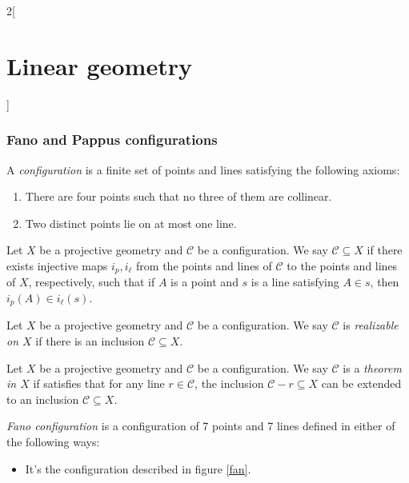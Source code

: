 \documentclass[../../../main.tex]{subfiles}
\begin{document}
\begin{multicols}{2}[\section{Linear geometry}]
  \subsubsection{Fano and Pappus configurations}
  \begin{definition}
    A \textit{configuration} is a finite set of points and lines satisfying the following axioms:
    \begin{enumerate}
      \item There are four points such that no three of them are collinear.
      \item Two distinct points lie on at most one line.
    \end{enumerate}
  \end{definition}
  \begin{definition}
    Let $X$ be a projective geometry and $\mathcal{C}$ be a configuration. We say $\mathcal{C}\subseteq X$ if there exists injective maps $i_p,i_\ell$ from the points and lines of $\mathcal{C}$ to the points and lines of $X$, respectively, such that if $A$ is a point and $s$ is a line satisfying $A\in s$, then $i_p(A)\in i_\ell(s)$.
  \end{definition}
  \begin{definition}
    Let $X$ be a projective geometry and $\mathcal{C}$ be a configuration. We say $\mathcal{C}$ is \textit{realizable on $X$} if there is an inclusion $\mathcal{C}\subseteq X$.
  \end{definition}
  \begin{definition}
    Let $X$ be a projective geometry and $\mathcal{C}$ be a configuration. We say $\mathcal{C}$ is a \textit{theorem in $X$} if satisfies that for any line $r\in\mathcal{C}$, the inclusion $\mathcal{C}-r\subseteq X$ can be extended to an inclusion $\mathcal{C}\subseteq X$.
  \end{definition}
  \begin{definition}
    \textit{Fano configuration} is a configuration of 7 points and 7 lines defined in either of the following ways:
    \begin{itemize}
      \item It's the configuration described in figure \ref{fan}.
            \begin{center}
              \begin{minipage}{\linewidth}
                \centering
                
                \label{fan}
              \end{minipage}

\end{center}
\end{itemize}
\end{definition}
\end{multicols}
\end{document}
